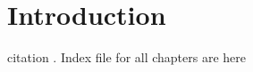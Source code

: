 \documentclass[../master.tex]{subfiles}
\begin{document}
\pagestyle{plain}
\chapter{Introduction}
citation \cite{Poole2017}.
Index file for all chapters are here
\end{document}
